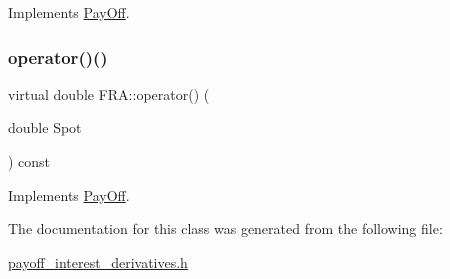 Implements \hyperlink{classPayOff_ad8194d5b82247ae89c25c515f0ba806a}{Pay\+Off}.

\hypertarget{classFRA_a48544283b697cd1d25c476acb6ed62df}{}\label{classFRA_a48544283b697cd1d25c476acb6ed62df} 
\subsubsection{\texorpdfstring{operator()()}{operator()()}}
{\footnotesize\ttfamily virtual double F\+R\+A\+::operator() (\begin{DoxyParamCaption}\item[{double}]{Spot }\end{DoxyParamCaption}) const\hspace{0.3cm}{\ttfamily [virtual]}}



Implements \hyperlink{classPayOff_a5ae17d82c233ef5568c8fb0539703000}{Pay\+Off}.



The documentation for this class was generated from the following file\+:\begin{DoxyCompactItemize}
\item 
\hyperlink{payoff__interest__derivatives_8h}{payoff\+\_\+interest\+\_\+derivatives.\+h}\end{DoxyCompactItemize}
